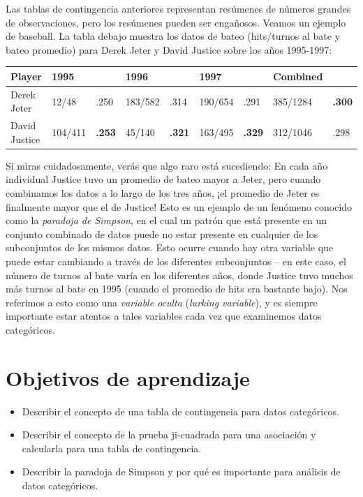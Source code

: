 \documentclass[
  12pt,
]{book}
\providecommand{\tightlist}{%
  \setlength{\itemsep}{0pt}\setlength{\parskip}{0pt}}
\begin{document}
Las tablas de contingencia anteriores representan resúmenes de números grandes de observaciones, pero los resúmenes pueden ser engañosos. Veamos un ejemplo de baseball. La tabla debajo muestra los datos de bateo (hits/turnos al bate y bateo promedio) para Derek Jeter y David Justice sobre los años 1995-1997:

\begin{longtable}[]{@{}lllllllll@{}}
\toprule
Player & 1995 & & 1996 & & 1997 & & Combined & \\
\midrule
\endhead
Derek Jeter & 12/48 & .250 & 183/582 & .314 & 190/654 & .291 & 385/1284 & \textbf{.300} \\
David Justice & 104/411 & \textbf{.253} & 45/140 & \textbf{.321} & 163/495 & \textbf{.329} & 312/1046 & .298 \\
\bottomrule
\end{longtable}

Si miras cuidadosamente, verás que algo raro está sucediendo: En cada año individual Justice tuvo un promedio de bateo mayor a Jeter, pero cuando combinamos los datos a lo largo de los tres años, ¡el promedio de Jeter es finalmente mayor que el de Justice! Esto es un ejemplo de un fenómeno conocido como la \emph{paradoja de Simpson}, en el cual un patrón que está presente en un conjunto combinado de datos puede no estar presente en cualquier de los subconjuntos de los mismos datos. Esto ocurre cuando hay otra variable que puede estar cambiando a través de los diferentes subconjuntos -- en este caso, el número de turnos al bate varía en los diferentes años, donde Justice tuvo muchos más turnos al bate en 1995 (cuando el promedio de hits era bastante bajo). Nos referimos a esto como una \emph{variable oculta} (\emph{lurking variable}), y es siempre importante estar atentos a tales variables cada vez que examinemos datos categóricos.

\hypertarget{objetivos-de-aprendizaje-11}{%
\section{Objetivos de aprendizaje}\label{objetivos-de-aprendizaje-11}}

\begin{itemize}
\tightlist
\item
  Describir el concepto de una tabla de contingencia para datos categóricos.
\item
  Describir el concepto de la prueba ji-cuadrada para una asociación y calcularla para una tabla de contingencia.
\item
  Describir la paradoja de Simpson y por qué es importante para análisis de datos categóricos.
\end{itemize}
\end{document}
